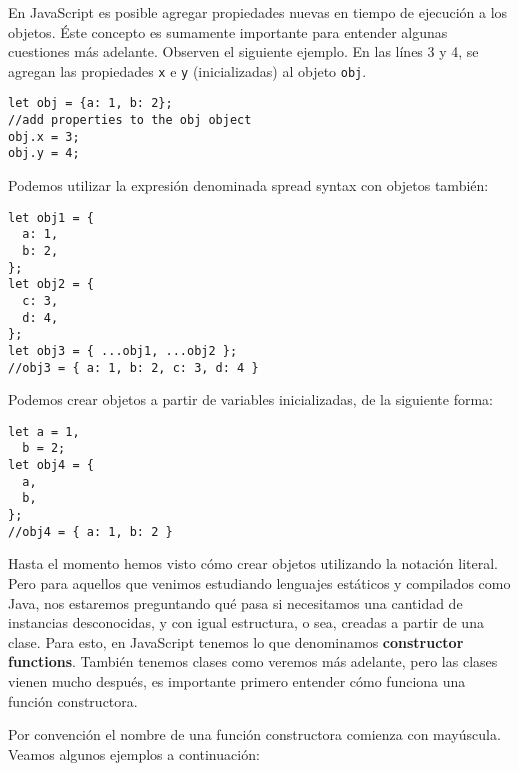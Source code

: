 \documentclass[a4paper, oneside, titlepage, 12pt]{paper}
\begin{document}
En JavaScript es posible agregar propiedades nuevas en tiempo de ejecución a los objetos. Éste concepto es sumamente importante para entender algunas cuestiones más adelante. Observen el siguiente ejemplo. En las línes 3 y 4, se agregan las propiedades \texttt{x} e \texttt{y} (inicializadas) al objeto \texttt{obj}.

\begin{verbatim}
let obj = {a: 1, b: 2};
//add properties to the obj object
obj.x = 3;
obj.y = 4;
\end{verbatim}

Podemos utilizar la expresión denominada spread syntax con objetos también:

\begin{verbatim}
let obj1 = {
  a: 1,
  b: 2,
};
let obj2 = {
  c: 3,
  d: 4,
};
let obj3 = { ...obj1, ...obj2 };
//obj3 = { a: 1, b: 2, c: 3, d: 4 }
\end{verbatim}

Podemos crear objetos a partir de variables inicializadas, de la siguiente forma:

\begin{verbatim}
let a = 1,
  b = 2;
let obj4 = {
  a,
  b,
};
//obj4 = { a: 1, b: 2 }	
\end{verbatim}

Hasta el momento hemos visto cómo crear objetos utilizando la notación literal. Pero para aquellos que venimos estudiando lenguajes estáticos y compilados como Java, nos estaremos preguntando qué pasa si necesitamos una cantidad de instancias desconocidas, y con igual estructura, o sea, creadas a partir de una clase. Para esto, en JavaScript tenemos lo que denominamos \textbf{constructor functions}. También tenemos clases como veremos más adelante, pero las clases vienen mucho después, es importante primero entender cómo funciona una función constructora.
\newline

Por convención el nombre de una función constructora comienza con mayúscula. Veamos algunos ejemplos a continuación:
\end{document}
